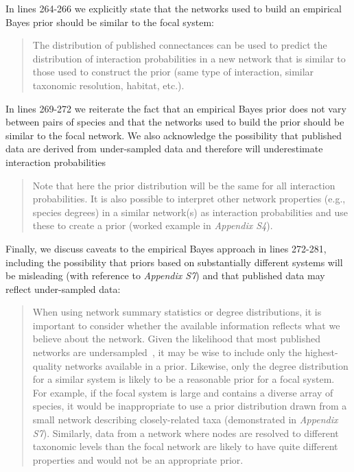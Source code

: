 \documentclass[12pt]{letter}
\begin{document}
		In lines 264-266 we explicitly state that the networks used to build an empirical Bayes prior should be similar to the focal system:


		\begin{quotation}

			The distribution of published connectances can be used to predict the distribution of interaction probabilities in a new network that is similar to those used to construct the prior (same type of interaction, similar taxonomic resolution, habitat, etc.).

		\end{quotation}


		In lines 269-272 we reiterate the fact that an empirical Bayes prior does not vary between pairs of species and that the networks used to build the prior should be similar to the focal network. We also acknowledge the possibility that published data are derived from under-sampled data and therefore will underestimate interaction probabilities


		\begin{quotation}

		Note that here the prior distribution will be the same for all interaction probabilities. It is also possible to interpret other network properties (e.g., species degrees) in a similar network(s) as interaction probabilities and use these to create a prior (worked example in \emph{Appendix S4}).

		\end{quotation}


		Finally, we discuss caveats to the empirical Bayes approach in lines 272-281, including the possibility that priors based on substantially different systems will be misleading (with reference to \emph{Appendix S7}) and that published data may reflect under-sampled data:


		\begin{quotation}

			When using network summary statistics or degree distributions, it is important to consider whether the available information reflects what we believe about the network. Given the likelihood that most published networks are undersampled~\citep{Jordano2016}, it may be wise to include only the highest-quality networks available in a prior. Likewise, only the degree distribution for a similar system is likely to be a reasonable prior for a focal system. For example, if the focal system is large and contains a diverse array of species, it would be inappropriate to use a prior distribution drawn from a small network describing closely-related taxa (demonstrated in \emph{Appendix S7}). Similarly, data from a network where nodes are resolved to different taxonomic levels than the focal network are likely to have quite different properties and would not be an appropriate prior.

		\end{quotation}
\end{document}
